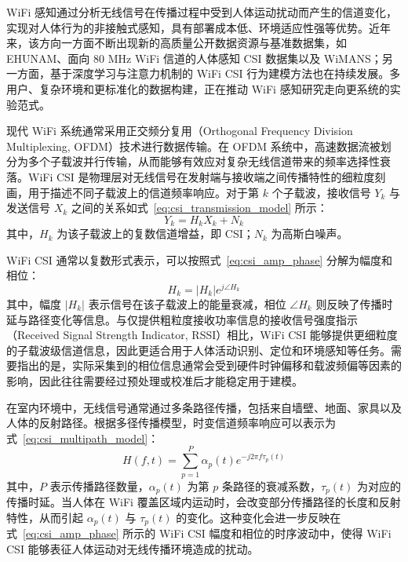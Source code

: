 
WiFi 感知通过分析无线信号在传播过程中受到人体运动扰动而产生的信道变化，实现对人体行为的非接触式感知，具有部署成本低、环境适应性强等优势。近年来，该方向一方面不断出现新的高质量公开数据资源与基准数据集，如 EHUNAM、面向 80 MHz WiFi 信道的人体感知 CSI 数据集以及 WiMANS；另一方面，基于深度学习与注意力机制的 WiFi CSI 行为建模方法也在持续发展\cite{de2025ehunam,meneghello2023csi,huang2024wimans,sruthi2024wi,hussain2024wisigpro}。多用户、复杂环境和更标准化的数据构建，正在推动 WiFi 感知研究走向更系统的实验范式。

现代 WiFi 系统通常采用正交频分复用（Orthogonal Frequency Division Multiplexing, OFDM）技术进行数据传输。在 OFDM 系统中，高速数据流被划分为多个子载波并行传输，从而能够有效应对复杂无线信道带来的频率选择性衰落。WiFi CSI 是物理层对无线信号在发射端与接收端之间传播特性的细粒度刻画，用于描述不同子载波上的信道频率响应。对于第 $k$ 个子载波，接收信号 $Y_k$ 与发送信号 $X_k$ 之间的关系如式~\eqref{eq:csi_transmission_model} 所示：
\begin{equation}
Y_k = H_k X_k + N_k
\label{eq:csi_transmission_model}
\end{equation}
其中，$H_k$ 为该子载波上的复数信道增益，即 CSI；$N_k$ 为高斯白噪声。

WiFi CSI 通常以复数形式表示，可以按照式~\eqref{eq:csi_amp_phase} 分解为幅度和相位：
\begin{equation}
H_k = |H_k| e^{j\angle H_k}
\label{eq:csi_amp_phase}
\end{equation}
其中，幅度 $|H_k|$ 表示信号在该子载波上的能量衰减，相位 $\angle H_k$ 则反映了传播时延与路径变化等信息。与仅提供粗粒度接收功率信息的接收信号强度指示（Received Signal Strength Indicator, RSSI）相比，WiFi CSI 能够提供更细粒度的子载波级信道信息，因此更适合用于人体活动识别、定位和环境感知等任务\cite{varga2024mitigating,quy2025enhanced}。需要指出的是，实际采集到的相位信息通常会受到硬件时钟偏移和载波频偏等因素的影响，因此往往需要经过预处理或校准后才能稳定用于建模。

在室内环境中，无线信号通常通过多条路径传播，包括来自墙壁、地面、家具以及人体的反射路径。根据多径传播模型，时变信道频率响应可以表示为式~\eqref{eq:csi_multipath_model}：
\begin{equation}
H(f,t) = \sum_{p=1}^{P} \alpha_p(t) e^{-j2\pi f \tau_p(t)}
\label{eq:csi_multipath_model}
\end{equation}
其中，$P$ 表示传播路径数量，$\alpha_p(t)$ 为第 $p$ 条路径的衰减系数，$\tau_p(t)$ 为对应的传播时延。当人体在 WiFi 覆盖区域内运动时，会改变部分传播路径的长度和反射特性，从而引起 $\alpha_p(t)$ 与 $\tau_p(t)$ 的变化。这种变化会进一步反映在式~\eqref{eq:csi_amp_phase} 所示的 WiFi CSI 幅度和相位的时序波动中，使得 WiFi CSI 能够表征人体运动对无线传播环境造成的扰动。


